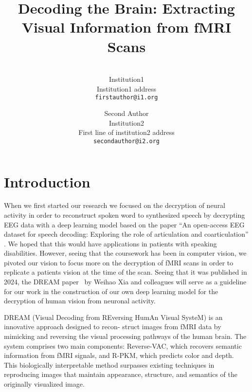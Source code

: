 \documentclass[10pt,twocolumn,letterpaper]{article}
\begin{document}
\title{Decoding the Brain: Extracting Visual Information from fMRI Scans}

\author{\\
Institution1\\
Institution1 address\\
{\tt\small firstauthor@i1.org}
\and
Second Author\\
Institution2\\
First line of institution2 address\\
{\tt\small secondauthor@i2.org}
}
\maketitle


\section{Introduction}
\label{sec:intro}

When we first started our research we focused on the
decryption of neural activity in order to reconstruct spoken
word to synthesized speech by decrypting EEG data with
a deep learning model based on the paper ``An open-access EEG dataset for speech decoding: Exploring the role of articulation and coarticulation'' \cite{moreira2022open}. We hoped that this would have applications in patients with speaking disabilities. However,
seeing that the coursework has been in computer vision, we
pivoted our vision to focus more on the decryption of fMRI
scans in order to replicate a patients vision at the time of the
scan. Seeing that it was published in 2024, the DREAM paper~\cite{xia2024dream} by Weihao Xia and colleagues will serve as a guideline for our work in the construction of our own deep learning model for the decryption of human vision from neuronal
activity.

DREAM (Visual Decoding from REversing HumAn Visual SysteM) is an innovative approach designed to recon-
struct images from fMRI data by mimicking and reversing the visual processing pathways of the human brain.
The system comprises two main components: Reverse-VAC, which recovers semantic
information from fMRI signals, and R-PKM, which predicts color and depth. This biologically interpretable method surpasses existing
techniques in reproducing images that maintain appearance, structure, and semantics of the originally visualized image.
\end{document}
